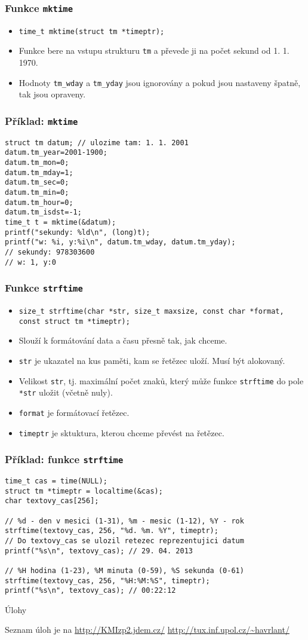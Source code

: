 \documentclass{beamer}
\newenvironment{itemizex}%
  {\large \begin{itemize}%
    \setlength{\itemsep}{8pt}%
    \setlength{\parskip}{8pt}}%
  {\end{itemize}}
\newenvironment{itemizey}%
  {\large \begin{itemize}%
    \setlength{\itemsep}{6pt}%
    \setlength{\parskip}{6pt}}%
  {\end{itemize}}
\begin{document}
\begin{frame}[t,fragile]\frametitle{Funkce \texttt{mktime}} 
  \begin{itemizex}
    \item \texttt{time\_t mktime(struct tm *timeptr);}
    \item Funkce bere na vstupu strukturu \texttt{tm} a převede ji na počet sekund od 1. 1. 1970. 
    \item Hodnoty \texttt{tm\_wday} a \texttt{tm\_yday} jsou ignorovány a pokud jsou nastaveny špatně, tak jsou opraveny. 
  \end{itemizex}
\end{frame}


\begin{frame}[t,fragile]\frametitle{Příklad: \texttt{mktime}} 
\begin{verbatim} 
struct tm datum; // ulozime tam: 1. 1. 2001
datum.tm_year=2001-1900;
datum.tm_mon=0;
datum.tm_mday=1;
datum.tm_sec=0;
datum.tm_min=0;
datum.tm_hour=0;
datum.tm_isdst=-1;
time_t t = mktime(&datum);
printf("sekundy: %ld\n", (long)t);
printf("w: %i, y:%i\n", datum.tm_wday, datum.tm_yday);
// sekundy: 978303600
// w: 1, y:0  
\end{verbatim}
\end{frame}


\begin{frame}[t,fragile]\frametitle{Funkce \texttt{strftime}} 
  \begin{itemizey}
    \item \texttt{size\_t strftime(char *str, size\_t maxsize, const char *format, const struct tm *timeptr);}
    \item Slouží k formátování data a času přesně tak, jak chceme. 
    \item \texttt{str} je ukazatel na kus paměti, kam se řetězec uloží. Musí být alokovaný.
    \item Velikost \texttt{str}, tj. maximální počet znaků, který může funkce \texttt{strftime} do pole \texttt{*str} uložit (včetně nuly).
    \item \texttt{format} je formátovací řetězec.
    \item \texttt{timeptr} je sktuktura, kterou chceme převést na řetězec.
  \end{itemizey}
\end{frame}


\begin{frame}[t,fragile]\frametitle{Příklad: funkce \texttt{strftime}} 
\begin{verbatim} 
time_t cas = time(NULL);
struct tm *timeptr = localtime(&cas);
char textovy_cas[256];

// %d - den v mesici (1-31), %m - mesic (1-12), %Y - rok
strftime(textovy_cas, 256, "%d. %m. %Y", timeptr);
// Do textovy_cas se ulozil retezec reprezentujici datum
printf("%s\n", textovy_cas); // 29. 04. 2013

// %H hodina (1-23), %M minuta (0-59), %S sekunda (0-61)
strftime(textovy_cas, 256, "%H:%M:%S", timeptr);
printf("%s\n", textovy_cas); // 00:22:12
\end{verbatim}
\end{frame}


\begin{frame}[t,fragile]{Úlohy}
\begin{center}
\vskip 1cm
{\Large Seznam úloh je na \url{http://KMIzp2.jdem.cz/}}
\vskip 2cm
\url{http://tux.inf.upol.cz/~havrlant/}
\end{center}
\end{frame}
\end{document}
